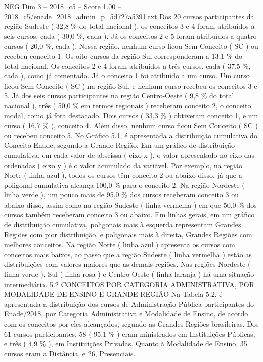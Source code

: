 \begin{textsample}{NEG Dim 3 – 2018\_c5 – Score 1.00 – 2018\_c5/enade\_2018\_admin\_p\_5d727a5391.txt}
Dos 20 cursos participantes da região Sudeste ( 32,8 \% do total nacional ), os conceitos 3 e 4 foram atribuídos a seis cursos, cada ( 30,0 \%, cada ).
Já os conceitos 2 e 5 foram atribuídos a quatro cursos ( 20,0 \%, cada ).
Nessa região, nenhum curso ficou Sem Conceito ( SC ) ou recebeu conceito 1.
Os oito cursos da região Sul corresponderam a 13,1 \% do total nacional.
Os conceitos 2 e 4 foram atribuídos a três cursos, cada ( 37,5 \%, cada ), como já comentado.
Já o conceito 1 foi atribuído a um curso.
Um curso ficou Sem Conceito ( SC ) na região Sul, e nenhum curso recebeu os conceitos 3 e 5.
Já dos seis cursos participantes na região Centro-Oeste ( 9,8 \% do total nacional ), três ( 50,0 \% em termos regionais ) receberam conceito 2, o conceito modal, como já fora destacado.
Dois cursos ( 33,3 \% ) obtiveram conceito 1, e um curso ( 16,7 \% ), conceito 4.
Além disso, nenhum curso ficou Sem Conceito ( SC ) ou recebeu conceito 5.
No Gráfico 5.1, é apresentada a distribuição cumulativa do Conceito Enade, segundo a Grande Região.
Em um gráfico de distribuição cumulativa, em cada valor de abscissa ( eixo x ), o valor apresentado no eixo das ordenadas ( eixo y ) é o valor acumulado da variável.
Por exemplo, na região Norte ( linha azul ), todos os cursos têm conceito 2 ou abaixo disso, já que a poligonal cumulativa alcança 100,0 \% para o conceito 2.
Na região Nordeste ( linha verde ), um pouco mais de 95,0 \% dos cursos receberam conceito 3 ou abaixo disso, assim como na região Sudeste ( linha vermelha ) em que 50,0 \% dos cursos também receberam conceito 3 ou abaixo.
Em linhas gerais, em um gráfico de distribuição cumulativa, poligonais mais à esquerda representam Grandes Regiões com pior distribuição, e poligonais mais à direita, Grandes Regiões com melhores conceitos.
Na região Norte ( linha azul ) apresenta os cursos com conceitos mais baixos, ao passo que a região Sudeste ( linha vermelha ) estão as distribuições com valores maiores que as demais regiões.
Nas regiões Nordeste ( linha verde ), Sul ( linha rosa ) e Centro-Oeste ( linha laranja ) há uma situação intermediária. 5.2 CONCEITOS POR CATEGORIA ADMINISTRATIVA, POR MODALIDADE DE ENSINO E GRANDE REGIÃO Na Tabela 5.2, é apresentada a distribuição dos cursos de Administração Pública participantes do Enade/2018, por Categoria Administrativa e Modalidade de Ensino, de acordo com os conceitos por eles alcançados, segundo as Grandes Regiões brasileiras.
Dos 61 cursos participantes, 58 ( 95,1 \% ) eram ministrados em Instituições Públicas, e três ( 4,9 \% ), em Instituições Privadas.
Quanto à Modalidade de Ensino, 35 cursos eram a Distância, e 26, Presenciais.

\end{textsample}
